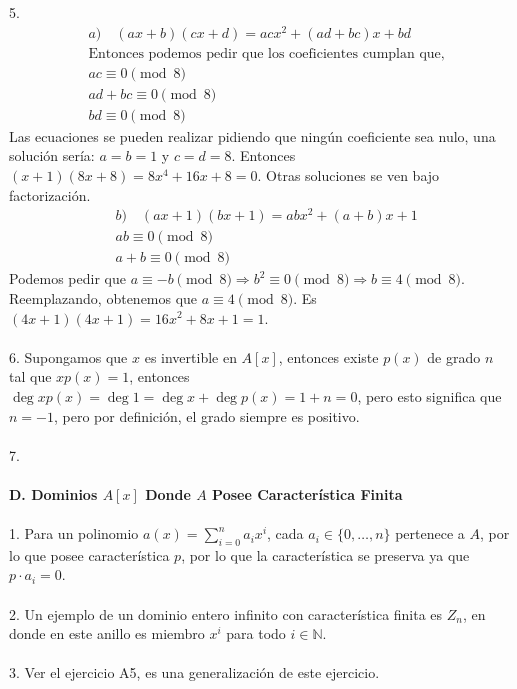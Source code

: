 \documentclass{article}
\begin{document}
5. 
\begin{equation*}
\begin{aligned}
    &a) \quad (ax+b)(cx+d)=acx^2+(ad+bc)x + bd \\
    &\text{Entonces podemos pedir que los coeficientes cumplan que,} \\
    &ac \equiv 0 \pmod{8} \\
    &ad+bc \equiv 0 \pmod{8} \\
    &bd \equiv 0 \pmod{8}
\end{aligned}
\end{equation*}
Las ecuaciones se pueden realizar pidiendo que ningún coeficiente sea nulo, una solución sería: $a=b=1$ y $c=d=8$. Entonces $(x+1)(8x+8)=8x^4 + 16x +8 =0$. Otras soluciones se ven bajo factorización.
\begin{equation*}
\begin{aligned}
    &b) \quad (ax+1)(bx+1)=abx^2 + (a+b)x +1 \\
    &ab \equiv 0 \pmod{8} \\
    &a+b \equiv 0 \pmod{8}
\end{aligned}
\end{equation*}
Podemos pedir que $a \equiv -b \pmod{8} \Longrightarrow b^2 \equiv 0 \pmod{8} \Longrightarrow b \equiv 4 \pmod{8}$. Reemplazando, obtenemos que $a \equiv 4 \pmod{8}$. Es $(4x+1)(4x+1)=16x^2 + 8x + 1 = 1$.
\\
\\
6. Supongamos que $x$ es invertible en $A[x]$, entonces existe $p(x)$ de grado $n$ tal que $xp(x)=1$, entonces $\deg{xp(x)}=\deg{1}=\deg{x}+\deg{p(x)}=1+n=0$, pero esto significa que $n=-1$, pero por definición, el grado siempre es positivo.
\\
\\
7.
\\
\\
\textbf{D. Dominios $A[x]$ Donde $A$ Posee Característica Finita}
\\
\\
1. Para un polinomio $a(x)=\sum_{i=0}^{n}a_i x^i$, cada $a_i \in \{0,\dots,n \}$ pertenece a $A$, por lo que posee característica $p$, por lo que la característica se preserva ya que $p \cdot a_i = 0$.
\\
\\
2. Un ejemplo de un dominio entero infinito con característica finita es $Z_n$, en donde en este anillo es miembro $x^i$ para todo $i \in \mathbb{N}$.
\\
\\
3. Ver el ejercicio A5, es una generalización de este ejercicio.
\end{document}
